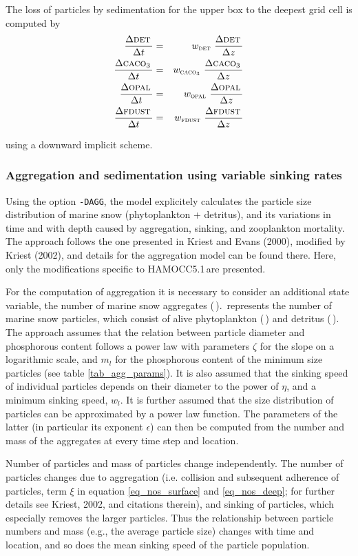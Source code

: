 \documentclass[11pt,a4paper,fleqn,twoside]{article}
\def\phy{\text{\textsc{phy}}\,}
\def\det{\text{\textsc{det}}\,}
\def\opal{\text{\textsc{opal}}\,}
\def\cal{\text{\textsc{caco$_3$}}\,}
\def\nos{\text{\textsc{nos}}\,}
\def\fdust{\text{\textsc{fdust}}\,}
\newcommand{\ham}{HAMOCC5.1\,}
\begin{document}
The loss of particles by sedimentation for the upper box to the deepest grid cell is computed by
\begin{eqnarray}
\frac{\Delta \det}{\Delta  t} & = & w_\det \, \frac{\Delta\det}{\Delta z}\\
\frac{\Delta \cal}{\Delta  t} & = & w_\cal \, \frac{\Delta\cal}{\Delta z}\\
\frac{\Delta \opal}{\Delta  t} & = & w_\opal \, \frac{\Delta\opal}{\Delta z}\\
\frac{\Delta \fdust}{\Delta  t} & = & w_\fdust \, \frac{\Delta\fdust}{\Delta z}
\end{eqnarray}

using a downward implicit scheme. 

\subsubsection{\label{sinking_variable}Aggregation and sedimentation using
variable sinking rates}

Using the option {\tt -DAGG}, the model explicitely calculates the particle
size distribution of marine snow (phytoplankton + detritus), and its variations
in time and with depth caused by aggregation, sinking, and zooplankton mortality. The
approach follows the one presented in Kriest and Evans (2000)\nocite{kriest:2000},
modified by Kriest (2002)\nocite{kriest:2002}, and details for the aggregation
model can be found there. Here, only the modifications specific to \ham are
presented.

For the computation of aggregation it is necessary to consider an additional 
state variable, the number of marine snow aggregates (\nos). \nos represents
the number of marine snow particles, which consist of alive phytoplankton (\phy)
and detritus (\det). The approach assumes that the relation between particle
diameter and phosphorous content follows a power law with parameters $\zeta$
for the slope on a logarithmic scale, and $m_l$ for the phosphorous content of
the minimum size particles (see table \ref{tab_agg_params}). It is also assumed that the 
sinking speed of individual particles depends on their diameter to the power of
$\eta$, and a minimum sinking speed, $w_l$. It is further assumed that the size
distribution of particles can be approximated by a power law function. The
parameters of the latter (in particular its exponent $\epsilon$) can then be
computed from the number and mass of the aggregates at every time step and
location. 

Number of particles and mass of particles change independently. 
The number of particles changes due to aggregation (i.e. collision
and subsequent adherence of particles, term $\xi$ in equation
\ref{eq_nos_surface} and \ref{eq_nos_deep}; for further details see Kriest,
2002, and citations therein), and sinking of particles, which especially
removes the larger particles. Thus the relationship between particle numbers and mass
(e.g., the average particle size) changes with time and location, and so does the
mean sinking speed of the particle population.
\end{document}
